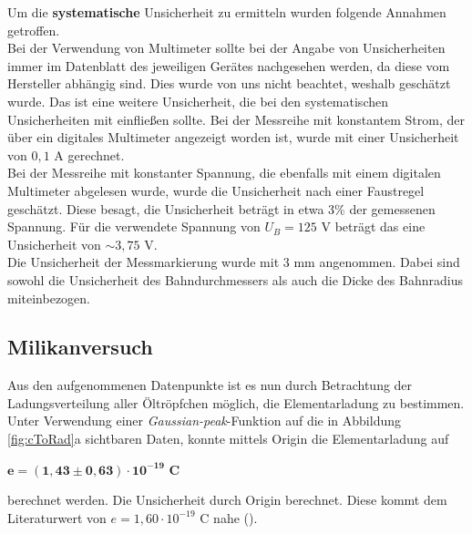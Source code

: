 \documentclass[a4paper,usenatbib]{aspdoc}
\begin{document}
            Um die \textbf{systematische} Unsicherheit zu ermitteln wurden folgende Annahmen getroffen.\\
            Bei der Verwendung von Multimeter sollte bei der Angabe von Unsicherheiten immer im Datenblatt des jeweiligen Gerätes nachgesehen werden, da diese vom Hersteller abhängig sind. Dies wurde von uns nicht beachtet, weshalb geschätzt wurde. Das ist eine weitere Unsicherheit, die bei den systematischen Unsicherheiten mit einfließen sollte. 
            Bei der Messreihe mit konstantem Strom, der über ein digitales Multimeter angezeigt worden ist, wurde mit einer Unsicherheit von $0,1$ A gerechnet.\\
            Bei der Messreihe mit konstanter Spannung, die ebenfalls mit einem digitalen Multimeter abgelesen wurde,  wurde die Unsicherheit nach einer Faustregel geschätzt. Diese besagt, die Unsicherheit beträgt in etwa 3\% der gemessenen Spannung. Für die verwendete Spannung von $U_B = 125$ V beträgt das eine Unsicherheit von $\sim 3,75$ V. \\
            Die Unsicherheit der Messmarkierung wurde mit $3$ mm angenommen. Dabei sind sowohl die Unsicherheit des Bahndurchmessers als auch die Dicke des Bahnradius miteinbezogen. 
          
        \subsection{Milikanversuch}\label{subsec:resmilikan}
            Aus den aufgenommenen Datenpunkte ist es nun durch Betrachtung der Ladungsverteilung aller Öltröpfchen möglich, die Elementarladung zu bestimmen. Unter Verwendung einer \textit{Gaussian-peak}-Funktion auf die in Abbildung \ref{fig:cToRad}a sichtbaren Daten, konnte mittels Origin die Elementarladung auf 
            \begin{center} 
                $\mathbf{e = (1,43 \pm 0,63)\cdot 10^{-19}}$ \textbf{C}
            \end{center} 
            berechnet werden. Die Unsicherheit durch Origin berechnet. Diese kommt dem Literaturwert von $e = 1,60 \cdot 10^{-19}$ C nahe (\cite{gerthsen}).
           
\end{document}
